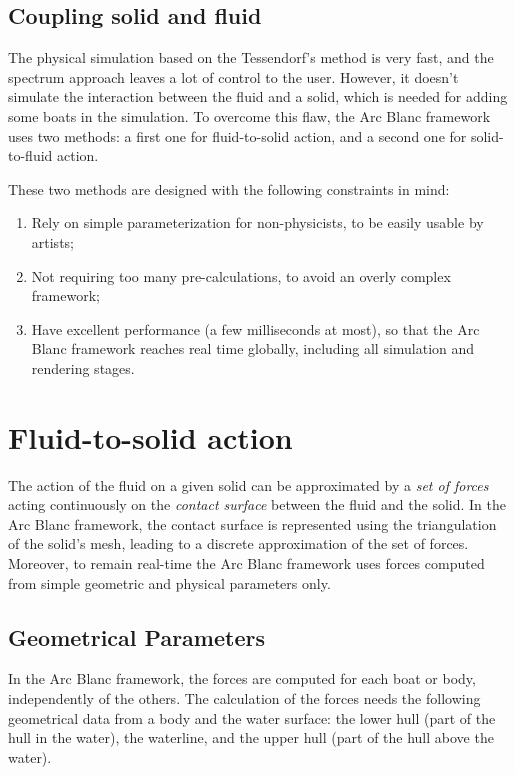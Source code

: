 \documentclass[final]{jcgt}
\def\framework{the Arc Blanc framework\xspace}
\begin{document}
\subsection{Coupling solid and fluid}
\label{sec:couplingSolidAndFluid}
The physical simulation based on the Tessendorf's method is very fast, and the spectrum approach leaves a lot of control to the user.
However, it doesn't simulate the interaction between the fluid and a solid, which is needed for adding some boats in the simulation.
To overcome this flaw, \framework uses two methods: a first one for fluid-to-solid action, and a second one for solid-to-fluid action.

These two methods are designed with the following constraints in mind:
\begin{enumerate}
	\item \label{enum:simpleParam} Rely on simple parameterization for non-physicists, to be easily usable by artists;
	\item \label{enum:noPrecal} Not requiring too many pre-calculations, to avoid an overly complex framework;
	\item \label{enum:perf} Have excellent performance (a few milliseconds at most), so that \framework reaches real time globally, including all simulation and rendering stages.
\end{enumerate}


\section{Fluid-to-solid action}
\label{sec:fluidToSolidAction}
The action of the fluid on a given solid can be approximated by a \emph{set of forces} acting continuously on the \emph{contact surface} between the fluid and the solid.
In \framework, the contact surface is represented using the triangulation of the solid's mesh, leading to a discrete approximation of the set of forces.
Moreover, to remain real-time \framework uses forces computed from simple geometric and physical parameters only.

\subsection{Geometrical Parameters}
\label{subsec:geomParam}
In \framework, the forces are computed for each boat or body, independently of the others.
The calculation of the forces needs the following geometrical data from a body and the water surface:
the lower hull (part of the hull in the water), the waterline, and the upper hull (part of the hull above the water).
\end{document}

